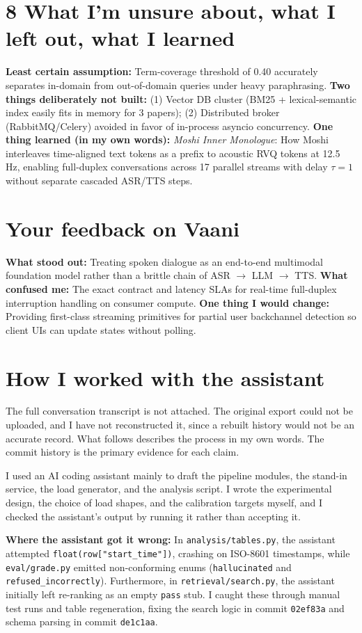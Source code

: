 \documentclass[10pt,a4paper]{article}
\begin{document}
\section*{8 What I'm unsure about, what I left out, what I learned}
\textbf{Least certain assumption:} Term-coverage threshold of 0.40 accurately separates in-domain from out-of-domain queries under heavy paraphrasing.
\textbf{Two things deliberately not built:} (1) Vector DB cluster (BM25 + lexical-semantic index easily fits in memory for 3 papers); (2) Distributed broker (RabbitMQ/Celery) avoided in favor of in-process asyncio concurrency.
\textbf{One thing learned (in my own words):} \textit{Moshi Inner Monologue}: How Moshi interleaves time-aligned text tokens as a prefix to acoustic RVQ tokens at 12.5 Hz, enabling full-duplex conversations across 17 parallel streams with delay $\tau=1$ without separate cascaded ASR/TTS steps.

\section*{Your feedback on Vaani}
\textbf{What stood out:} Treating spoken dialogue as an end-to-end multimodal foundation model rather than a brittle chain of ASR $\to$ LLM $\to$ TTS.
\textbf{What confused me:} The exact contract and latency SLAs for real-time full-duplex interruption handling on consumer compute.
\textbf{One thing I would change:} Providing first-class streaming primitives for partial user backchannel detection so client UIs can update states without polling.

\section*{How I worked with the assistant}
The full conversation transcript is not attached. The original export could not be uploaded, and I have not reconstructed it, since a rebuilt history would not be an accurate record. What follows describes the process in my own words. The commit history is the primary evidence for each claim.

I used an AI coding assistant mainly to draft the pipeline modules, the stand-in service, the load generator, and the analysis script. I wrote the experimental design, the choice of load shapes, and the calibration targets myself, and I checked the assistant's output by running it rather than accepting it.

\textbf{Where the assistant got it wrong:} In \texttt{analysis/tables.py}, the assistant attempted \texttt{float(row["start\_time"])}, crashing on ISO-8601 timestamps, while \texttt{eval/grade.py} emitted non-conforming enums (\texttt{hallucinated} and \texttt{refused\_incorrectly}). Furthermore, in \texttt{retrieval/search.py}, the assistant initially left re-ranking as an empty \texttt{pass} stub. I caught these through manual test runs and table regeneration, fixing the search logic in commit \texttt{02ef83a} and schema parsing in commit \texttt{de1c1aa}.
\end{document}
